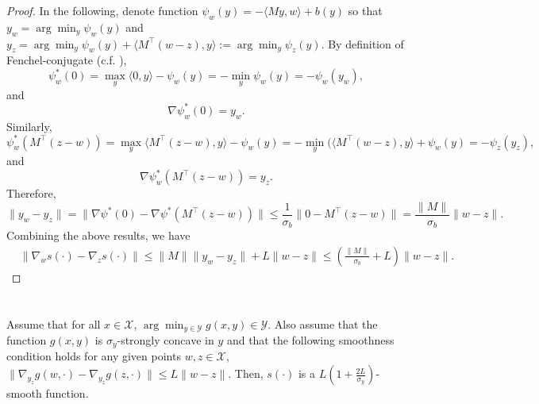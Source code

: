 \documentclass[final,12pt]{colt2018} %
\newcommand{\yx}[1]{y_{#1}}
\newcommand{\XX}{\mathcal{X}}
\newcommand{\YY}{\mathcal{Y}}
\newcommand{\pr}[1]{\left(#1\right)}
\begin{document}
\begin{proof}
In the following,
denote function  $\psi_w(y)= - \langle M y, w \rangle + b(y)$
so that $\yx{w} = \arg\min_y \psi_w(y)$ and $\yx{z} = \arg\min_y \psi_w(y) + \langle M^\top(w-z), y \rangle
:= \arg\min_y \psi_{z}(y)$.
By definition of Fenchel-conjugate (c.f. \cite{R96,BL06}),
\begin{equation}
\psi_w^*(0) = \max_{y} \langle 0, y \rangle  - \psi_w(y) = - \min_y \psi_w(y) = - \psi_w(\yx{w}),
\end{equation}
and
\begin{equation}
\nabla \psi_w^*(0) = \yx{w}.
\end{equation}
Similarly,
\begin{equation}
\psi_w^*( M^\top(z-w)) = \max_{y} \langle M^\top (z-w), y \rangle  - \psi_w(y) = - \min_y (  
\langle M^\top(w-z), y \rangle + \psi_w(y) = - \psi_z(\yx{z}),
\end{equation}
and
\begin{equation}
\nabla \psi_w^*( M^\top(z-w)) = \yx{z}.
\end{equation}
Therefore,
\begin{equation}
\| \yx{w} - \yx{z} \| = \| \nabla \psi^*(0) - \nabla \psi^*( M^\top(z-w)) \| \leq \frac{1}{\sigma_b}  
\| 0 - M^\top(z-w)\|  = \frac{\| M\|}{\sigma_b} \| w- z \|.
\end{equation}
Combining the above results, we have 
\begin{equation}
\begin{aligned}
& \| \nabla_w s(\cdot) - \nabla_z s(\cdot ) \| \leq 
\| M\| \|  \yx{w}  - \yx{z}  \| 
+ 
L \| w - z \|  \leq \pr{ \frac{ \| M \|}{\sigma_b} + L} \| w - z\|.
\end{aligned}
\end{equation}


\end{proof}


\section{} \label{app:smooth2}


\begin{proposition} \label{thm:smooth2}
Assume that for all $x\in \XX$, $\arg \min_{y\in \YY} g(x,y) \in \YY$. Also assume that the function $g(x,y)$ is $\sigma_y$-strongly concave in $y$ and that the following smoothness condition holds for any given points $w,z \in \XX$,
$  \| \nabla_{\yx{z}} g(w,\cdot) - \nabla_{\yx{z}} g(z,\cdot)   \| \le L \| w - z \|.$
Then, $s(\cdot)$ is a $L(1+\frac{2L}{\sigma_y})$-smooth function.
\end{proposition}
\end{document}
